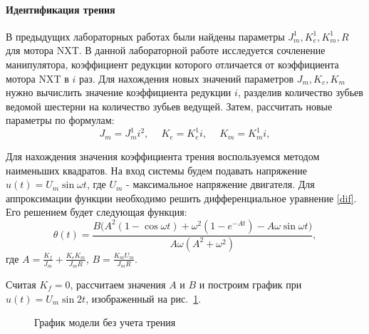 \paragraph*{Идентификация трения\\}%
\hspace*{\parindent}В предыдущих лабораторных работах были найдены параметры $J_m^1, K_e^1, K_m^1, R$ для мотора NXT. В данной лабораторной работе исследуется сочленение манипулятора, коэффициент редукции которого отличается от коэффициента мотора NXT в $i$ раз. Для нахождения новых значений параметров $J_m, K_e, K_m$ нужно вычислить значение коэффициента редукции $i$, разделив количество зубьев ведомой шестерни на количество зубьев ведущей. Затем, рассчитать новые параметры по формулам:
\begin{equation}
	J_m=J_m^1i^2, \phantom{-} K_e = K_e^1i, \phantom{-} K_m = K_m^1i,
\end{equation}

Для нахождения значения коэффициента трения воспользуемся методом наименьших квадратов. На вход системы будем подавать напряжение $u(t) = U_m\sin{{\omega}t}$, где $U_m$ - максимальное напряжение двигателя. Для аппроксимации функции необходимо решить дифференциальное уравнение \eqref{dif}. Его решением будет следующая функция:
\begin{equation}\label{theta}
	\theta(t)=\frac{B(A^2(1-\cos{{\omega}}t)+\omega^2(1-e^{-At})-A\omega\sin{{\omega}t)}}{A\omega(A^2+\omega^2)},
\end{equation}где $A=\frac{K_f}{J_m}+\frac{K_eK_m}{J_mR}$, $B=\frac{K_mU_m}{J_mR}$.

Считая $K_f = 0$, рассчитаем значения $A$ и $B$ и построим график при $u(t) = U_m\sin{2t}$, изображенный на рис.~\ref{nofr}.

\begin{figure}[h]
	\noindent{}
	\caption{График модели без учета трения}
	\label{nofr}
\end{figure}

